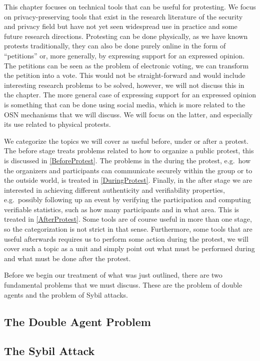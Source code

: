 This chapter focuses on technical tools that can be useful for protesting.
We focus on privacy-preserving tools that exist in the research literature of 
the security and privacy field but have not yet seen widespread use in practice 
and some future research directions.
Protesting can be done physically, as we have known protests traditionally, 
they can also be done purely online in the form of \enquote{petitions} or, more 
generally, by expressing support for an expressed opinion.
The petitions can be seen as the problem of electronic voting, we can transform 
the petition into a vote.
This would not be straight-forward and would include interesting research 
problems to be solved, however, we will not discuss this in the chapter.
The more general case of expressing support for an expressed opinion is 
something that can be done using social media, which is more related to the 
\ac{OSN} mechanisms that we will discuss.
We will focus on the latter, and especially its use related to physical 
protests.

We categorize the topics we will cover as useful before, under or after 
a protest.
The before stage treats problems related to how to organize a public protest, 
this is discussed in \cref{BeforeProtest}.
The problems in the during the protest, e.g.\ how the organizers and 
participants can communicate securely within the group or to the outside world, 
is treated in \cref{DuringProtest}.
Finally, in the after stage we are interested in achieving different 
authenticity and verifiability properties, e.g.\ possibly following up an event 
by verifying the participation and computing verifiable statistics, such as how 
many participants and in what area.
This is treated in \cref{AfterProtest}.
Some tools are of course useful in more than one stage, so the categorization 
is not strict in that sense.
Furthermore, some tools that are useful afterwards requires us to perform some 
action during the protest, we will cover such a topic as a unit and simply 
point out what must be performed during and what must be done after the 
protest.

Before we begin our treatment of what was just outlined, there are two 
fundamental problems that we must discuss.
These are the problem of double agents and the problem of Sybil attacks.

\subsection{The Double Agent Problem}
\label{DoubleAgentProblem}



\subsection{The Sybil Attack}
\label{SybilAttacks}



